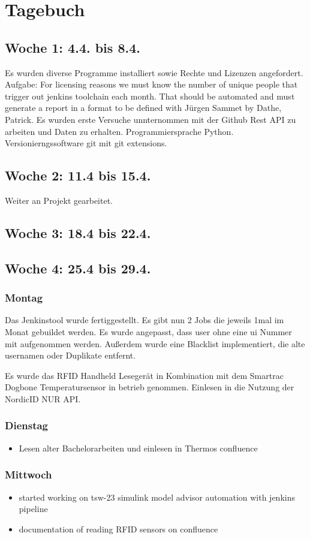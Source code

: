 \chapter{Tagebuch}

\section{Woche 1: 4.4. bis 8.4.}
Es wurden diverse Programme installiert sowie Rechte und Lizenzen angefordert. Aufgabe: For licensing reasons we must know the number of unique people that trigger out jenkins toolchain each month. That should be automated and must generate a report in a format to be defined with Jürgen Sammet by Dathe, Patrick. Es wurden erste Versuche unnternommen mit der Github Rest API zu arbeiten und Daten zu erhalten. Programmiersprache Python. Versionierngssoftware git mit git extensions.

\section{Woche 2: 11.4 bis 15.4.}
Weiter an Projekt gearbeitet. 
\section{Woche 3: 18.4 bis 22.4.}

\section{Woche 4: 25.4 bis 29.4.}
\subsection{Montag}
Das Jenkinstool wurde fertiggestellt. Es gibt nun 2 Jobs die jeweils 1mal im Monat gebuildet werden. Es wurde angepasst, dass user ohne eine ui Nummer mit aufgenommen werden. Außerdem wurde eine Blacklist implementiert, die alte usernamen oder Duplikate entfernt. 

Es wurde das RFID Handheld Lesegerät in Kombination mit dem Smartrac Dogbone Temperatursensor in betrieb genommen. Einlesen in die Nutzung der NordicID NUR API.

\subsection{Dienstag}
\begin{itemize}
	\item Lesen alter Bachelorarbeiten und einlesen in Thermos confluence
\end{itemize}

\subsection{Mittwoch}
\begin{itemize}
	\item started working on tsw-23 simulink model advisor automation with jenkins pipeline
	\item documentation of reading RFID sensors on confluence
\end{itemize}